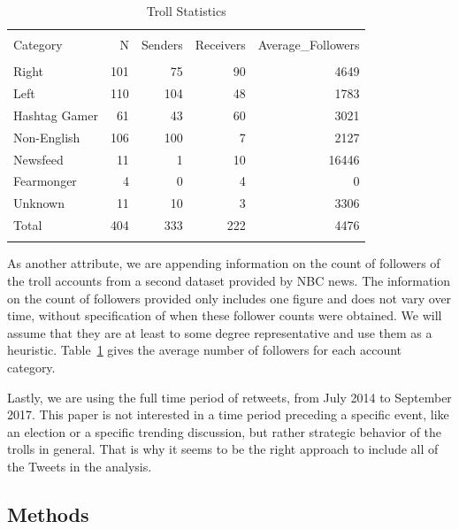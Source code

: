 \documentclass[12pt, titlepage=true, toc=bib]{scrartcl}
\begin{document}
\begin{table}[ht] \centering 
\begin{tabular*}{.95\linewidth}{@{\extracolsep{\fill}} lrrrr} 
\\[-1.8ex]\hline 
\hline \\[-1.8ex] 
Category & N & Senders & Receivers & Average\_Followers \\ 
\hline \\[-1.8ex] 
Right & 101 & 75 & 90 & 4649 \\ 
Left & 110 & 104 & 48 & 1783 \\ 
Hashtag Gamer & 61 & 43 & 60 & 3021 \\ 
Non-English & 106 & 100 & 7 & 2127 \\ 
Newsfeed & 11 & 1 & 10 & 16446 \\ 
Fearmonger & 4 & 0 & 4 & 0 \\ 
Unknown & 11 & 10 & 3 & 3306 \\ 
Total & 404 & 333 & 222 & 4476 \\ 
\hline \\[-1.8ex] 
\end{tabular*} 
  \caption{Troll Statistics} 
  \label{tab:trollstat} 
\end{table} 
 
As another attribute, we are appending information on the count of followers of the troll accounts from a second dataset provided by NBC news. The information on the count of followers provided only includes one figure and does not vary over time, without specification of when these follower counts were obtained. We will assume that they are at least to some degree representative and use them as a heuristic. Table~\ref{tab:trollstat} gives the average number of followers for each account category.

Lastly, we are using the full time period of retweets, from July 2014 to September 2017. This paper is not interested in a time period preceding a specific event, like an election or a specific trending discussion, but rather strategic behavior of the trolls in general. That is why it seems to be the right approach to include all of the Tweets in the analysis.

\subsection{Methods}
\end{document}
